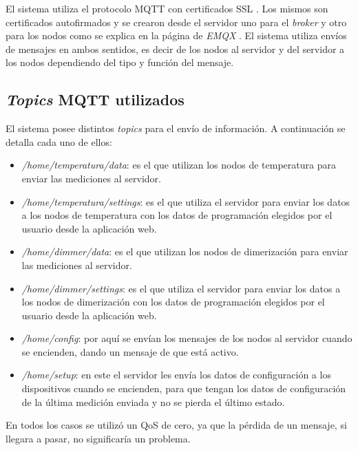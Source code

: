 El sistema utiliza el protocolo MQTT con certificados SSL \citep{39}. Los mismos son certificados autofirmados y se crearon desde el servidor uno para el \textit{broker} y otro para los nodos como se explica en la página de \textit{EMQX} \citep{40}. El sistema utiliza envíos de mensajes en ambos sentidos, es decir de los nodos al servidor y del servidor a los nodos dependiendo del tipo y función del mensaje.

\subsection{\textit{Topics} MQTT utilizados}

El sistema posee distintos \textit{topics} para el envío de información. A continuación se detalla cada uno de ellos:

\begin{itemize}
	\item \textit{/home/temperatura/data}: es el que utilizan los nodos de temperatura para enviar las mediciones al servidor.
	\item \textit{/home/temperatura/settings}: es el que utiliza el servidor para enviar los datos a los nodos de temperatura con los datos de programación elegidos por el usuario desde la aplicación web.
	\item \textit{/home/dimmer/data}: es el que utilizan los nodos de dimerización para enviar las mediciones al servidor.
	\item \textit{/home/dimmer/settings}:  es el que utiliza el servidor para enviar los datos a los nodos de dimerización con los datos de programación elegidos por el usuario desde la aplicación web.
	\item \textit{/home/config}: por aquí se envían los mensajes de los nodos al servidor cuando se encienden, dando un mensaje de que está activo.
	\item \textit{/home/setup}: en este el servidor les envía los datos de configuración a los dispositivos cuando se encienden, para que tengan los datos de configuración de la última medición enviada y no se pierda el último estado.
\end{itemize}

En todos los casos se utilizó un QoS de cero, ya que la pérdida de un mensaje, si llegara a pasar, no significaría un problema.